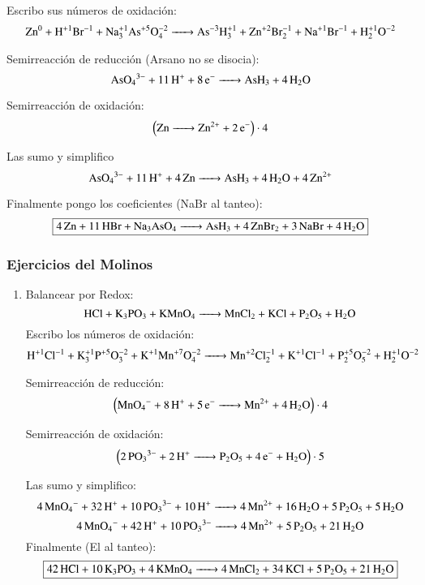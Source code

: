 \begin{enumerate}
Escribo sus números de oxidación:
$$\ce{
Zn^0 + H^{+1}Br^{-1} + Na^{+1}3As^{+5}O^{-2}4 ->
As^{-3}H^{+1}3 + Zn^{+2}Br^{-1}2 + Na^{+1}Br^{-1} + H^{+1}2O^{-2}
}$$


\begin{multicols}{2}
    Semirreacción de reducción (Arsano no se disocia):
    $$\ce{
    AsO4^{3-} + 11H^+ + 8e^- ->
    AsH3 + 4H2O
    }$$
    
    Semirreacción de oxidación:
    $$\left(\ce{
    Zn ->
    Zn^{2+} + 2e^-
    }\right) \cdot 4$$
\end{multicols}

Las sumo y simplifico
$$\ce{
AsO4^{3-} + 11H^+ + 4Zn ->
AsH3 + 4H2O + 4Zn^{2+}
}$$

Finalmente pongo los coeficientes (NaBr al tanteo):
$$\fbox{\ce{
4Zn + 11HBr + Na3AsO4 ->
AsH3 + 4ZnBr2 + 3NaBr + 4H2O
}}$$

\end{enumerate}


\subsubsection*{Ejercicios del Molinos}

\begin{enumerate}
\item Balancear por Redox:
$$\ce{
HCl + K3PO3 + KMnO4 ->
MnCl2 + KCl + P2O5 + H2O
}$$
Escribo los números de oxidación:
$$\ce{
H^{+1}Cl^{-1} + K^{+1}3P^{+5}O^{-2}3 + K^{+1}Mn^{+7}O^{-2}4 ->
Mn^{+2}Cl^{-1}2 + K^{+1}Cl^{-1} + P^{+5}2O^{-2}5 + H^{+1}2O^{-2}
}$$


\begin{multicols}{2}
    Semirreacción de reducción:
    $$\left(\ce{
    MnO4^- + 8H^+ + 5e^- ->
    Mn^{2+} + 4H2O
    }\right) \cdot 4$$
    
    Semirreacción de oxidación:
    $$\left(\ce{
    2PO3^{3-} + 2H^+ ->
    P2O5 + 4e^- + H2O
    }\right) \cdot 5$$
\end{multicols}

Las sumo y simplifico:
$$\ce{
4MnO4^- + 32H^+ + 10 PO3^{3-} + 10H^+ ->
4Mn^{2+} + 16H2O + 5P2O5 + 5H2O
}$$
$$\ce{
4MnO4^- + 42H^+ + 10 PO3^{3-} ->
4Mn^{2+} + 5P2O5 + 21H2O
}$$
Finalmente (El  al tanteo):
$$\fbox{\ce{
42HCl + 10K3PO3 + 4KMnO4 ->
4MnCl2 + 34KCl + 5P2O5 + 21H2O
}}$$
\end{enumerate}